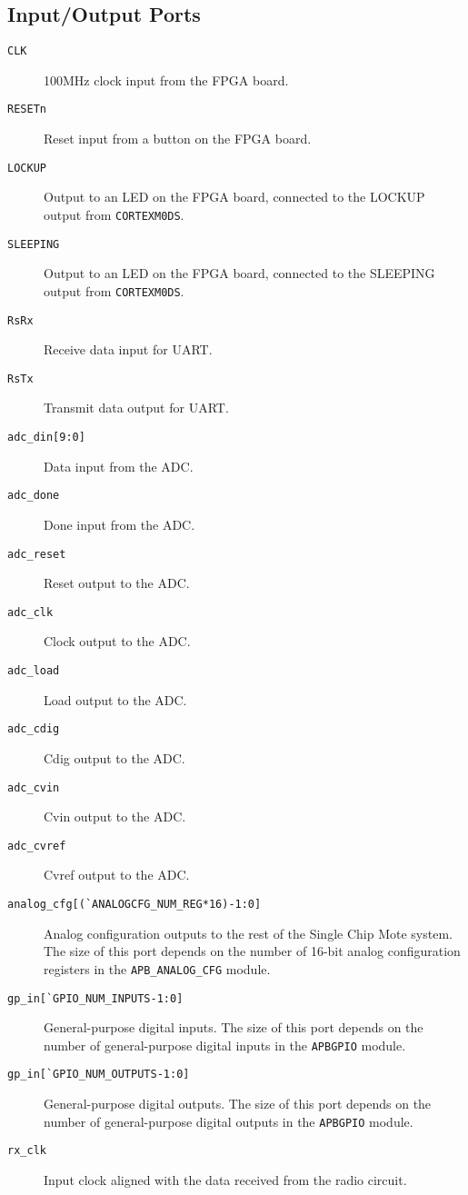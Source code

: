\subsection{Input/Output Ports}
\begin{description}
	\item[\texttt{CLK}] 100MHz clock input from the FPGA board.
	\item[\texttt{RESETn}] Reset input from a button on the FPGA board.
	\item[\texttt{LOCKUP}] Output to an LED on the FPGA board, connected to the LOCKUP output from \texttt{CORTEXM0DS}.
	\item[\texttt{SLEEPING}] Output to an LED on the FPGA board, connected to the SLEEPING output from \texttt{CORTEXM0DS}.
	\item[\texttt{RsRx}] Receive data input for UART.
	\item[\texttt{RsTx}] Transmit data output for UART.
	\item[\texttt{adc\_din[9:0]}] Data input from the ADC.
	\item[\texttt{adc\_done}] Done input from the ADC.
	\item[\texttt{adc\_reset}] Reset output to the ADC.
	\item[\texttt{adc\_clk}] Clock output to the ADC.
	\item[\texttt{adc\_load}] Load output to the ADC.
	\item[\texttt{adc\_cdig}] Cdig output to the ADC.
	\item[\texttt{adc\_cvin}] Cvin output to the ADC.
	\item[\texttt{adc\_cvref}] Cvref output to the ADC.
	\item[\texttt{analog\_cfg[(\`{}ANALOGCFG\_NUM\_REG*16)-1:0]}] Analog configuration outputs to the rest of the Single Chip Mote system. The size of this port depends on the number of 16-bit analog configuration registers in the \texttt{APB\_ANALOG\_CFG} module.
	\item[\texttt{gp\_in[\`{}GPIO\_NUM\_INPUTS-1:0]}] General-purpose digital inputs. The size of this port depends on the number of general-purpose digital inputs in the \texttt{APBGPIO} module.
	\item[\texttt{gp\_in[\`{}GPIO\_NUM\_OUTPUTS-1:0]}] General-purpose digital outputs. The size of this port depends on the number of general-purpose digital outputs in the \texttt{APBGPIO} module.
	\item[\texttt{rx\_clk}] Input clock aligned with the data received from the radio circuit.

\end{description}
